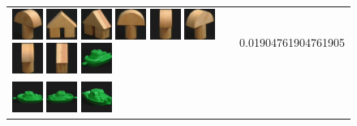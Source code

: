\begin{figure}[tbp]
\begin{center}
\begin{tabular}{m{11cm} | m{3cm} |}
\includegraphics[width=1cm]{coil/beeld-4.eps} 
\includegraphics[width=1cm]{coil/beeld-42.eps} 
\includegraphics[width=1cm]{coil/beeld-46.eps} 
\includegraphics[width=1cm]{coil/beeld-1.eps} 
\includegraphics[width=1cm]{coil/beeld-5.eps} 
\includegraphics[width=1cm]{coil/beeld-3.eps} 
\includegraphics[width=1cm]{coil/beeld-2.eps} 
\includegraphics[width=1cm]{coil/beeld-47.eps} 
\includegraphics[width=1cm]{coil/beeld-57.eps} & {\scriptsize 
0.01904761904761905} \\ \includegraphics[width=1cm]{coil/beeld-54.eps} 
\includegraphics[width=1cm]{coil/beeld-55.eps} 
\includegraphics[width=1cm]{coil/beeld-58.eps} 

\end{tabular}
\end{center}
\end{figure}
